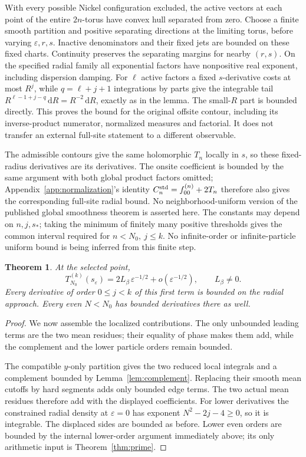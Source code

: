 \documentclass[11pt]{article}
\numberwithin{equation}{section}
\newtheorem{theorem}{Theorem}[section]
\theoremstyle{definition}
\newcommand{\dd}{\,\mathrm d}
\newcommand{\eps}{\varepsilon}
\newcommand{\se}{s_\varepsilon}
\begin{document}
With every possible Nickel configuration excluded, the active vectors
at each point of the entire \(2n\)-torus have convex hull separated from zero. Choose a finite
smooth partition and positive separating directions at the limiting
torus, before varying \(\eps,r,s\). Inactive denominators and their
fixed jets are bounded on these fixed charts. Continuity preserves
the separating margins for nearby \((r,s)\). On the specified radial
family all exponential factors have nonpositive real exponent,
including dispersion damping. For \(\ell\) active factors a fixed
\(s\)-derivative costs at most \(R^j\), while
\(q=\ell+j+1\) integrations by parts give the integrable tail
\(R^{\ell-1+j-q}\dd R=R^{-2}\dd R\), exactly as in the lemma.
The small-\(R\) part is bounded directly. This proves the bound for
the original offsite contour, including its inverse-product numerator,
normalized measures and factorial. It does not transfer an external
full-site statement to a different observable.

The admissible contours give the same holomorphic \(T_n\) locally
in \(s\), so these fixed-radius derivatives are its derivatives.
The onsite coefficient is bounded by the same argument with both
global product factors omitted; Appendix~\ref{app:normalization}'s
identity \(C_n^{\rm std}=f_{00}^{(n)}+2T_n\) therefore also gives the
corresponding full-site radial bound. No neighborhood-uniform version
of the published global smoothness theorem is asserted here. The
constants may depend on \(n,j,s_*\); taking the minimum of finitely
many positive thresholds gives the common interval required for
\(n<N_0,\ j\le k\). No infinite-order or infinite-particle uniform
bound is being inferred from this finite step.

\begin{theorem}\label{thm:first}
At the selected point,
\[
 T_{N_0}^{(k)}(\se)=2L_\beta\,\eps^{-1/2}+o(\eps^{-1/2}),
 \qquad L_\beta\ne0.
\]
Every derivative of order \(0\le j<k\) of this first term is bounded
on the radial approach. Every even \(N<N_0\) has bounded derivatives
there as well.
\end{theorem}
\begin{proof}
We now assemble the localized contributions. The only unbounded leading terms are the two mean residues; their equality of phase makes them add, while the complement and the lower particle orders remain bounded.

The compatible \(y\)-only partition gives the two reduced local
integrals and a complement bounded by Lemma~\ref{lem:complement}.
Replacing their smooth mean cutoffs by hard segments adds only bounded
edge terms. The two actual mean residues therefore add with the
displayed coefficients. For lower derivatives the constrained radial
density at \(\eps=0\)
has exponent \(N^2-2j-4\ge0\), so it is integrable.
The displaced sides are bounded as before. Lower even orders are
bounded by the internal lower-order argument immediately above; its
only arithmetic input is Theorem~\ref{thm:prime}.
\end{proof}
\end{document}
